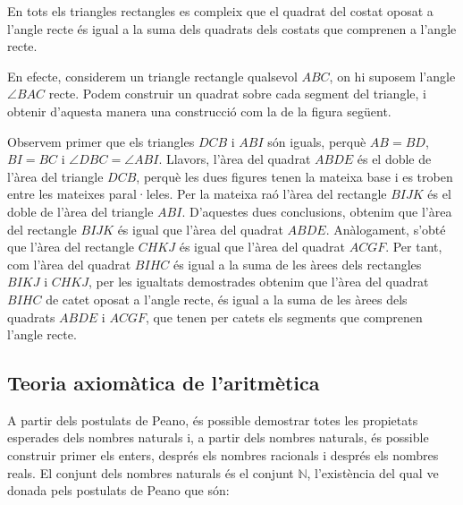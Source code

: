 \begin{teorema}
En tots els triangles rectangles es compleix que el quadrat del costat
oposat a l'angle recte és igual a la suma dels quadrats dels costats que
comprenen a l'angle recte.
\end{teorema}

\begin{prova}
En efecte, considerem un triangle rectangle qualsevol $ABC$, on hi suposem
l'angle $\angle BAC$ recte. Podem construir un quadrat sobre cada segment
del triangle, i obtenir d'aquesta manera una construcció com la de la
figura següent. 

Observem primer que els triangles $DCB$ i $ABI$ són iguals, perquè $AB=BD$, $BI=BC$ i $\angle DBC=\angle ABI$. Llavors, l'àrea del quadrat $ABDE$ és el doble de l'àrea del triangle $DCB$, perquè les dues
figures tenen la mateixa base i es troben entre les mateixes
paral·leles. Per la mateixa raó l'àrea del
rectangle $BIJK$ és el doble de l'àrea del triangle $ABI$.
D'aquestes dues conclusions, obtenim que l'àrea del rectangle $BIJK$
és igual que l'àrea del quadrat $ABDE$. Anàlogament, s'obté
que l'àrea del rectangle $CHKJ$ és igual que l'àrea del quadrat $ACGF$. Per tant, com l'àrea del quadrat $BIHC$ és igual a la suma de
les àrees dels rectangles $BIKJ$ i $CHKJ$, per les igualtats demostrades
obtenim que l'àrea del quadrat $BIHC$ de catet oposat a l'angle recte,
és igual a la suma de les àrees dels quadrats $ABDE$ i $ACGF$, que
tenen per catets els segments que comprenen l'angle recte.
\end{prova}

\subsection{Teoria axiomàtica de l'aritmètica}

A partir dels postulats de Peano, és possible demostrar totes les
propietats esperades dels nombres naturals i, a partir dels nombres naturals,
és possible construir primer els enters, després els nombres
racionals i després els nombres reals. El conjunt dels nombres naturals
és el conjunt $\mathbb{N}$, l'existència del qual ve donada pels
postulats de Peano que són:

